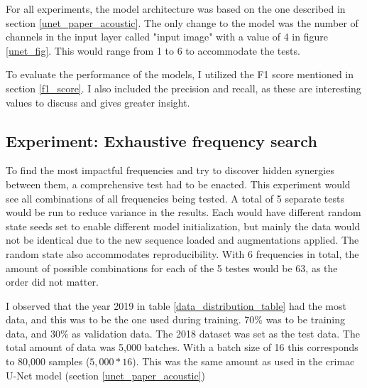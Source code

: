         
        For all experiments, the model architecture was based on the one described in section \ref{unet_paper_acoustic}. The only change to the model was the number of channels in the input layer called "input image" with a value of 4 in figure \ref{unet_fig}. This would range from 1 to 6 to accommodate the tests.
        
        To evaluate the performance of the models, I utilized the F1 score mentioned in section \ref{f1_score}. I also included the precision and recall, as these are interesting values to discuss and gives greater insight.
        
    
    \subsection{Experiment: Exhaustive frequency search}
        To find the most impactful frequencies and try to discover hidden synergies between them, a comprehensive test had to be enacted. This experiment would see all combinations of all frequencies being tested. A total of 5 separate tests would be run to reduce variance in the results. Each would have different random state seeds set to enable different model initialization, but mainly the data would not be identical due to the new sequence loaded and augmentations applied. The random state also accommodates reproducibility. With 6 frequencies in total, the amount of possible combinations for each of the 5 testes would be 63, as the order did not matter.
        
        I observed that the year 2019 in table \ref{data_distribution_table} had the most data, and this was to be the one used during training. 70\% was to be training data, and 30\% as validation data. The 2018 dataset was set as the test data. The total amount of data was 5,000 batches. With a batch size of 16 this corresponds to 80,000 samples ($5,000 * 16$). This was the same amount as used in the \gls{crimac} U-Net model (section \ref{unet_paper_acoustic})
        
